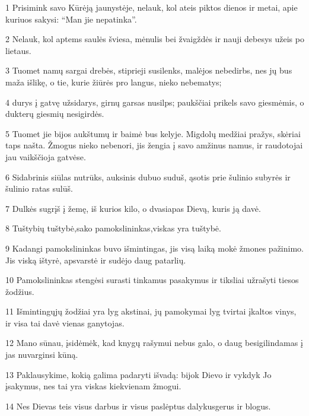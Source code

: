 \par 1 Prisimink savo Kūrėją jaunystėje, nelauk, kol ateis piktos dienos ir metai, apie kuriuos sakysi: “Man jie nepatinka”. 
\par 2 Nelauk, kol aptems saulės šviesa, mėnulis bei žvaigždės ir nauji debesys užeis po lietaus. 
\par 3 Tuomet namų sargai drebės, stiprieji susilenks, malėjos nebedirbs, nes jų bus maža išlikę, o tie, kurie žiūrės pro langus, nieko nebematys; 
\par 4 durys į gatvę užsidarys, girnų garsas nusilps; paukščiai prikels savo giesmėmis, o dukterų giesmių nesigirdės. 
\par 5 Tuomet jie bijos aukštumų ir baimė bus kelyje. Migdolų medžiai pražys, skėriai taps našta. Žmogus nieko nebenori, jis žengia į savo amžinus namus, ir raudotojai jau vaikščioja gatvėse. 
\par 6 Sidabrinis siūlas nutrūks, auksinis dubuo suduš, ąsotis prie šulinio subyrės ir šulinio ratas sulūš. 
\par 7 Dulkės sugrįš į žemę, iš kurios kilo, o dvasia­pas Dievą, kuris ją davė. 
\par 8 Tuštybių tuštybė,­sako pamokslininkas,­viskas yra tuštybė. 
\par 9 Kadangi pamokslininkas buvo išmintingas, jis visą laiką mokė žmones pažinimo. Jis viską ištyrė, apsvarstė ir sudėjo daug patarlių. 
\par 10 Pamokslininkas stengėsi surasti tinkamus pasakymus ir tiksliai užrašyti tiesos žodžius. 
\par 11 Išmintingųjų žodžiai yra lyg akstinai, jų pamokymai lyg tvirtai įkaltos vinys, ir visa tai davė vienas ganytojas. 
\par 12 Mano sūnau, įsidėmėk, kad knygų rašymui nebus galo, o daug besigilindamas į jas nuvarginsi kūną. 
\par 13 Paklausykime, kokią galima padaryti išvadą: bijok Dievo ir vykdyk Jo įsakymus, nes tai yra viskas kiekvienam žmogui. 
\par 14 Nes Dievas teis visus darbus ir visus paslėptus dalykus­gerus ir blogus.



